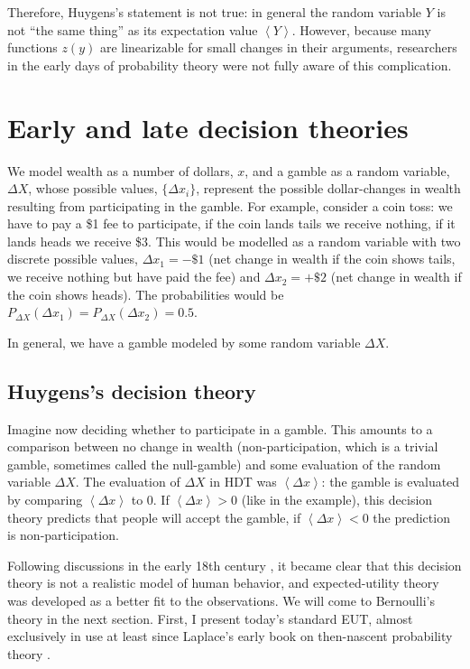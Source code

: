 \documentclass[pdftex]{article}
\newcommand{\ave}[1]{\left\langle#1 \right\rangle}
\newcommand{\seclabel}[1]{\label{section:#1}}
\newcommand{\Dx}{{\Delta x}}
\newcommand{\DX}{{\Delta X}}
\begin{document}
Therefore, Huygens's statement is not true: in general the random variable $Y$ is not ``the same thing'' as its expectation value $\ave{Y}$. However, because many functions $z(y)$ are linearizable for small changes in their arguments, researchers in the early days of probability theory were not fully aware of this complication.

\section{Early and late decision theories}
\seclabel{Early}
We model wealth as a number of dollars, $x$, and a gamble as a random variable, $\DX$, whose possible values, $\{\Dx_i\}$, represent the possible dollar-changes in wealth resulting from participating in the gamble. For example, consider a coin toss: we have to pay a \$1 fee to participate, if the coin lands tails we receive nothing, if it lands heads we receive \$3. This would be modelled as a random variable with two discrete possible values, $\Dx_1=-\$1$ (net change in wealth if the coin shows tails, we receive nothing but have paid the fee) and $\Dx_2=+\$2$ (net change in wealth if the coin shows heads). The probabilities would be $P_\DX(\Dx_1)=P_\DX(\Dx_2)=0.5$.

In general, we have a gamble modeled by some random variable $\DX$.

\subsection{Huygens's decision theory}
Imagine now deciding whether to participate in a gamble. This amounts to a comparison between no change in wealth (non-participation, which is a trivial gamble, sometimes called the null-gamble) and some evaluation of the random variable $\DX$. The evaluation of $\DX$ in HDT was $\ave{\Dx}$: the gamble is evaluated by comparing $\ave{\Dx}$ to 0. If $\ave{\Dx}>0$ (like in the example), this decision theory predicts that people will accept the gamble, if $\ave{\Dx}<0$ the prediction is non-participation.

Following discussions in the early 18th century \cite[p.~402]{Montmort1713}, it became clear that this decision theory is not a realistic model of human behavior, and expected-utility theory was developed as a better fit to the observations. We will come to Bernoulli's theory in the next section. First, I present today's standard EUT, almost exclusively in use at least since Laplace's early book on then-nascent probability theory \cite{Laplace1814}. 
\end{document}
